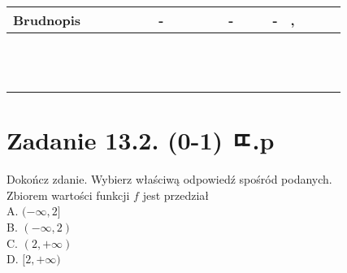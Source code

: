 \documentclass[10pt]{article}
\begin{document}
\begin{center}
\begin{tabular}{|c|c|c|c|c|c|c|c|c|c|c|c|c|c|c|c|c|c|c|c|c|c|}
\hline
\multicolumn{4}{|l|}{Brudnopis} &  &  &  &  &  & - &  &  &  &  & - &  &  & - & , &  &  &  \\
\hline
 &  &  &  &  &  &  &  &  &  &  &  &  &  &  &  &  &  &  &  &  &  \\
\hline
 &  &  &  &  &  &  &  &  &  &  &  &  &  &  &  &  &  &  &  &  &  \\
\hline
 &  &  &  &  &  &  &  &  &  &  &  &  &  &  &  &  &  &  &  &  &  \\
\hline
 &  &  &  &  &  &  &  &  &  &  &  &  &  &  &  &  &  &  &  &  &  \\
\hline
 &  &  &  &  &  &  &  &  &  &  &  &  &  &  &  &  &  &  &  &  &  \\
\hline
 &  &  &  &  &  &  &  &  &  &  &  &  &  &  &  &  &  &  &  &  &  \\
\hline
 &  &  &  &  &  &  &  &  &  &  &  &  &  &  &  &  &  &  &  &  &  \\
\hline
 &  &  &  &  &  &  &  &  &  &  &  &  &  &  &  &  &  &  &  &  &  \\
\hline
 &  &  &  &  &  &  &  &  &  &  &  &  &  &  &  &  &  &  &  &  &  \\
\hline
 &  &  &  &  &  &  &  &  &  &  &  &  &  &  &  &  &  &  &  &  &  \\
\hline
 &  &  &  &  &  &  &  &  &  &  &  &  &  &  &  &  &  &  &  &  &  \\
\hline
 &  &  &  &  &  &  &  &  &  &  &  &  &  &  &  &  &  &  &  &  &  \\
\hline
\end{tabular}
\end{center}

\section*{Zadanie 13.2. (0-1) ㄸ.p}
Dokończ zdanie. Wybierz właściwą odpowiedź spośród podanych.\\
Zbiorem wartości funkcji \(f\) jest przedział\\
A. \((-\infty, 2]\)\\
B. \((-\infty, 2)\)\\
C. \((2,+\infty)\)\\
D. \([2,+\infty)\)
\end{document}
